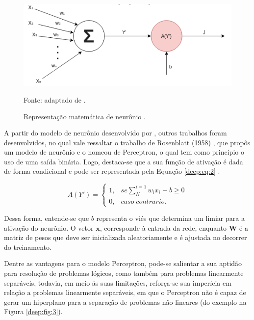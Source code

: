 \begin{figure}[H]
    \centering
    \caption{Representação matemática de neurônio \cite{mcculloch1943logical}.}
    \includegraphics[width=1\linewidth]{recursos/imagens/deep/neuronio_mc.png}
    \label{deep:fig:2}

    \vspace*{1 cm}
    Fonte: adaptado de \cite{mcculloch1943logical}.
\end{figure}

A partir do modelo de neurônio desenvolvido por \cite{mcculloch1943logical},  outros trabalhos foram desenvolvidos, no qual vale ressaltar o trabalho de Rosenblatt (1958) \cite{Rosenblatt1958}, que propôs um modelo de neurônio e o nomeou de Perceptron, o qual tem como princípio o uso de uma saída binária. Logo, destaca-se que a sua função de ativação é dada de forma condicional e pode ser representada pela Equação \ref{deep:eq:2} \cite{Rosenblatt1958}.

\begin{equation}
    \label{deep:eq:2}
    A(Y') = \left\{\begin{matrix}
     1,& se \sum_{N}^{i=1} w_i x_i + b \geq 0 \\ 
     0,& caso \;  contrario.
    \end{matrix}\right.
\end{equation}

Dessa forma, entende-se que $b$ representa o viés que determina um limiar para a ativação do neurônio. O vetor $\textbf{x}$, corresponde à entrada da rede, enquanto $\textbf{W}$ é a matriz de pesos que deve ser inicializada aleatoriamente e é ajustada no decorrer do treinamento.

Dentre as vantagens para o modelo Perceptron, pode-se salientar a sua aptidão para resolução de problemas lógicos, como também para problemas linearmente separáveis, todavia, em meio ás suas limitações, reforça-se sua imperícia em relação a problemas linearmente separáveis, em que o Perceptron não é capaz de gerar um hiperplano para a separação de problemas não lineares (do exemplo na Figura \ref{deep:fig:3}).

